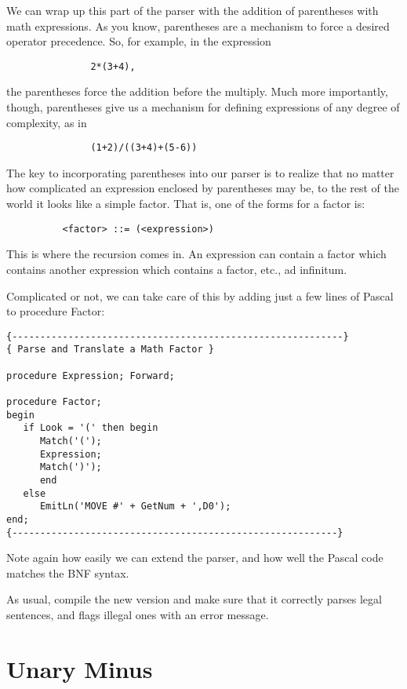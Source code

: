 We  can  wrap  up this part of the parser with  the  addition  of parentheses with  math expressions. As you know, parentheses are a  mechanism to force a desired operator  precedence. So, for example, in the expression

\begin{verbatim}
               2*(3+4),
\end{verbatim}

the parentheses force the addition  before  the  multiply. Much more importantly, though, parentheses  give  us  a  mechanism for defining expressions of any degree of complexity, as in

\begin{verbatim}
               (1+2)/((3+4)+(5-6))
\end{verbatim}

The  key  to  incorporating  parentheses  into our parser  is  to realize that  no matter how complicated an expression enclosed by parentheses may be, to  the  rest  of  the world it looks like a simple factor. That is, one of the forms for a factor is:

\begin{verbatim}
          <factor> ::= (<expression>)
\end{verbatim}

This is where the recursion comes in. An expression can contain a factor which contains another expression which contains a factor, etc., ad infinitum.

Complicated or not, we can take care of this by adding just a few lines of Pascal to procedure Factor:

\begin{verbatim}
{-----------------------------------------------------------}
{ Parse and Translate a Math Factor }

procedure Expression; Forward;

procedure Factor;
begin
   if Look = '(' then begin
      Match('(');
      Expression;
      Match(')');
      end
   else
      EmitLn('MOVE #' + GetNum + ',D0');
end;
{----------------------------------------------------------}
\end{verbatim}

Note again how easily we can extend the parser, and how  well the Pascal code matches the BNF syntax.

As usual, compile the new version and make sure that it correctly parses  legal sentences, and flags illegal  ones  with  an  error message.

\section{Unary Minus}

